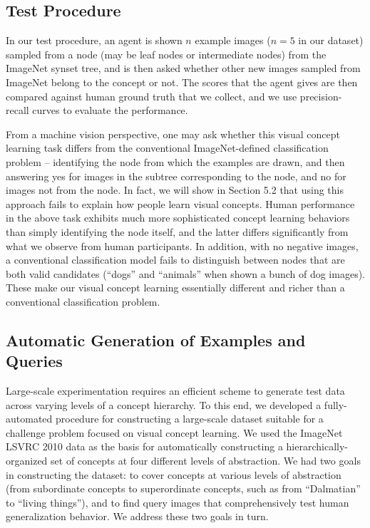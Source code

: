 \subsection{Test Procedure}

In our test procedure, an agent is shown $n$ example images ($n=5$ in our dataset) sampled from a node (may be leaf nodes or intermediate nodes) from the ImageNet synset tree, and is then asked whether other new images sampled from ImageNet belong to the concept or not. The scores that the agent gives are then compared against human ground truth that we collect, and we use precision-recall curves to evaluate the performance.

From a machine vision perspective, one may ask whether this visual concept learning task differs from the conventional ImageNet-defined classification problem -- identifying the node from which the examples are drawn, and then answering yes for images in the subtree corresponding to the node, and no for images not from the node. In fact, we will show in Section 5.2 that using this approach fails to explain how people learn visual concepts. Human performance in the above task exhibits much more sophisticated concept learning behaviors than simply identifying the node itself, and the latter differs significantly from what we observe from human participants. In addition, with no negative images, a conventional classification model fails to distinguish between nodes that are both valid candidates (\eg ``dogs'' and ``animals'' when shown a bunch of dog images). These make our visual concept learning essentially different and richer than a conventional classification problem.

\subsection{Automatic Generation of Examples and Queries}

Large-scale experimentation requires an efficient scheme to generate test data across varying levels of a concept hierarchy. To this end, we developed a fully-automated procedure for constructing a large-scale dataset suitable for a challenge problem focused on visual concept learning. We used the ImageNet LSVRC \cite{ilsvrc} 2010 data as the basis for automatically constructing a hierarchically-organized set of concepts at four different levels of abstraction. We had two goals in constructing the dataset: to cover concepts at various levels of abstraction (from subordinate concepts to superordinate concepts, such as from “Dalmatian” to “living things”), and to find query images that comprehensively test human generalization behavior. We address these two goals in turn.

